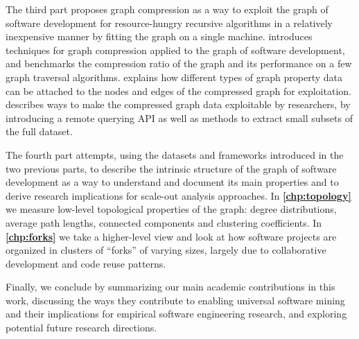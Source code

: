The third part proposes graph compression as a way to exploit the graph of
software development for resource-hungry recursive algorithms in a relatively
inexpensive manner by fitting the graph on a single machine.
\textbf{} introduces techniques for graph
compression applied to the graph of software development, and benchmarks the
compression ratio of the graph and its performance on a few graph traversal
algorithms. \textbf{} explains how different types of
graph property data can be attached to the nodes and edges of the compressed
graph for exploitation. \textbf{} describes ways
to make the compressed graph data exploitable by researchers, by introducing a
remote querying API as well as methods to extract small subsets of the full
dataset.

The fourth part attempts, using the datasets and frameworks introduced in the
two previous parts, to describe the intrinsic structure of the graph of
software development as a way to understand and document its main properties
and to derive research implications for scale-out analysis approaches. In
\textbf{\cref{chp:topology}} we measure low-level topological properties of the
graph: degree distributions, average path lengths, connected components and
clustering coefficients. In \textbf{\cref{chp:forks}} we take a higher-level
view and look at how software projects are organized in clusters of ``forks''
of varying sizes, largely due to collaborative development and code reuse
patterns.

Finally, we conclude by summarizing our main academic contributions in this
work, discussing the ways they contribute to enabling universal software mining
and their implications for empirical software engineering research, and
exploring potential future research directions.

